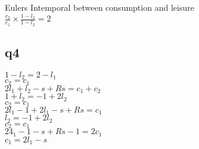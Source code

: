 \documentclass[11pt]{article}
\begin{document}
Eulers Intemporal between consumption and leisure\\

$\frac{c_{2}}{c_{1}} \times \frac {1-l_{2}}{1-l_{2}}=2$


\subsection{q4}

$1-l_{2}=2-l_{1}$\\

$c_{2}=c_{1}$\\

$2l_{1}+l_{2}-s+Rs=c_{1}+c_{2}$\\

$1+l_{2}=-1+2l_{2}$\\

$c_{2}=c_{1}$\\

$2l_{1}-1+2l_{1}-s+Rs=c_{1}$\\


$l_{2}=-1+2l_{2}$\\

$c_{2}=c_{1}$\\

$24_{1}-1-s+Rs-1=2c_{1}$\\

$c_{1}=2l_{1}-s$\\
\end{document}
